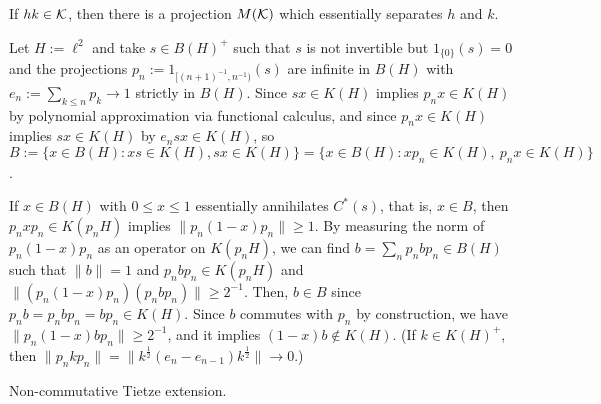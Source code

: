 \documentclass{../../large}
\begin{document}
If $hk\in\mathcal{K}$, then there is a projection $M(\mathcal{K})$ which essentially separates $h$ and $k$.


Let $H:=\ell^2$ and take $s\in B(H)^+$ such that $s$ is not invertible but $1_{\{0\}}(s)=0$ and the projections $p_n:=1_{[(n+1)^{-1},n^{-1})}(s)$ are infinite in $B(H)$ with $e_n:=\sum_{k\le n}p_k\to1$ strictly in $B(H)$.
Since $sx\in K(H)$ implies $p_nx\in K(H)$ by polynomial approximation via functional calculus, and since $p_nx\in K(H)$ implies $sx\in K(H)$ by $e_nsx\in K(H)$, so $B:=\{x\in B(H):xs\in K(H),sx\in K(H)\}=\{x\in B(H):xp_n\in K(H),\ p_nx\in K(H)\}$.

If $x\in B(H)$ with $0\le x\le1$ essentially annihilates $C^*(s)$, that is, $x\in B$, then $p_nxp_n\in K(p_nH)$ implies $\|p_n(1-x)p_n\|\ge1$.
By measuring the norm of $p_n(1-x)p_n$ as an operator on $K(p_nH)$, we can find $b=\sum_np_nbp_n\in B(H)$ such that $\|b\|=1$ and $p_nbp_n\in K(p_nH)$ and $\|(p_n(1-x)p_n)(p_nbp_n)\|\ge2^{-1}$.
Then, $b\in B$ since $p_nb=p_nbp_n=bp_n\in K(H)$.
Since $b$ commutes with $p_n$ by construction, we have $\|p_n(1-x)bp_n\|\ge2^{-1}$, and it implies $(1-x)b\notin K(H)$.
(If $k\in K(H)^+$, then $\|p_nkp_n\|=\|k^{\frac12}(e_n-e_{n-1})k^{\frac12}\|\to0$.)


Non-commutative Tietze extension.
\end{document}
